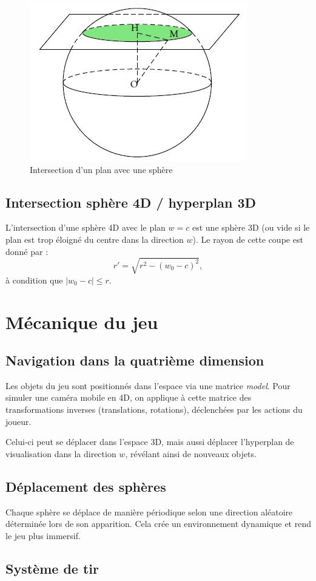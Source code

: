 \documentclass[11pt,a4paper]{article}
\begin{document}
\begin{figure}[H]
	\centering
	\includegraphics[width=0.3\linewidth]{intersection-sphere}
	\caption{Intersection d’un plan avec une sphère}
	\label{fig:inter-plan-sphere}
\end{figure}

\subsection{Intersection sphère 4D / hyperplan 3D}

L’intersection d’une sphère 4D avec le plan $w = c$ est une sphère 3D (ou vide si le plan est trop éloigné du centre dans la direction $w$). Le rayon de cette coupe est donné par :
\[
	r' = \sqrt{r^2 - (w_0 - c)^2},
\]
à condition que $|w_0 - c| \leq r$.

\section{Mécanique du jeu}

\subsection{Navigation dans la quatrième dimension}

Les objets du jeu sont positionnés dans l’espace via une matrice \textit{model}. Pour simuler une caméra mobile en 4D, on applique à cette matrice des transformations inverses (translations, rotations), déclenchées par les actions du joueur.

Celui-ci peut se déplacer dans l’espace 3D, mais aussi déplacer l’hyperplan de visualisation dans la direction $w$, révélant ainsi de nouveaux objets.

\subsection{Déplacement des sphères}

Chaque sphère se déplace de manière périodique selon une direction aléatoire déterminée lors de son apparition. Cela crée un environnement dynamique et rend le jeu plus immersif.

\subsection{Système de tir}
\end{document}

